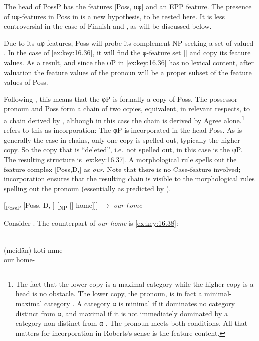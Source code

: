 \documentclass[output=paper]{langsci/langscibook}
\begin{document}
The head of PossP has the features [Poss, uφ] and an \gls{EPP} feature. The presence of uφ-features in Poss in 
is a new hypothesis, to be tested here. It is less controversial in the case of
Finnish and , as will be discussed below.

Due to its uφ-features, Poss will probe its complement NP seeking a set of
valued . In the case of \eqref{ex:key:16.36}, it will find the φ-feature set [\Fpl{}]
and copy its feature values. As a result, and since the φP in \eqref{ex:key:16.36} has no
lexical content, after valuation the feature values of the pronoun will be a
proper subset of the feature values of Poss.

Following \textcite{Roberts2010,Roberts2010b}, this means that the φP is formally a copy of Poss.
The possessor pronoun and Poss form a chain of two copies, equivalent, in
relevant respects, to a chain derived by , although in this case the
chain is derived by Agree alone.\footnote{The fact that the lower copy is a
    maximal category while the higher copy is a head is no obstacle. The lower
    copy, the pronoun, is in fact a minimal-maximal category
    \citep[249]{Chomsky1995}. A category α is minimal if it dominates no
    category distinct from α, and maximal if it is not immediately
    dominated by a category non-distinct from α
    \citep[54--56]{Roberts2010}. The pronoun meets both conditions. All that
matters for incorporation in Roberts’s sense is the feature
content.\label{fn:16.19}} \textcite{Roberts2010,Roberts2010b} refers to this as incorporation: The φP is incorporated in the head
Poss. As is generally the case in chains, only one copy is spelled out,
typically the higher copy. So the copy that is \enquote{deleted}, i.e.\  not
spelled out, in this case is the φP. The resulting structure is
\eqref{ex:key:16.37}. A morphological rule spells out the feature complex
[Poss,D,\Fpl{}] as \emph{our}. Note that there is no Case-feature involved;
incorporation ensures that the resulting chain is visible to the morphological
rules spelling out the pronoun (essentially as predicted by
\citealt[117--119]{Baker1988}).

\ea\label{ex:key:16.37}
    {}[\textsubscript{PossP} [Poss, D, \Fpl{}] [\textsubscript{NP} [\sout{\Fpl}]
        home]]] $\rightarrow$ \emph{our home}
\z

Consider . The counterpart of \emph{our home} is \eqref{ex:key:16.38}:

\ea\label{ex:key:16.38} \\
    \gll (meidän) koti-mme\\
        \hphantom{(}our home-\Fpl{}\\
\z
\end{document}
